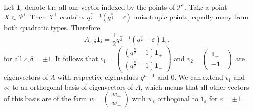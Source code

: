 \documentclass[a4paper]{article}
\theoremstyle{definition}
\newcommand{\eps}{\varepsilon}
\newcommand{\one}{\mathbf 1}
\newcommand{\pp}{\mathcal P}
\begin{document}
Let $\one_\eps$ denote the all-one vector indexed by the points of $\pp^\eps$.
Take a point $X \in \pp^\eps$.
Then $X^\perp$ contains $q^{\frac n2 -1} \left( q^\frac n2 - \eps \right)$ anisotropic points, equally many from both quadratic types.
Therefore,
\[
 A_{\eps,\delta} \one_\delta = \frac 12 q^{\frac n2 - 1} \left( q^\frac n2 - \eps \right) \one_\eps,
\]
for all $\eps, \delta = \pm 1$.
It follows that 
$v_1 = \begin{pmatrix}
 \left( q^\frac n2 - 1 \right) \one_+ \\ \left( q^\frac n2 + 1 \right) \one_-
\end{pmatrix}$
and
$ v_2 = \begin{pmatrix} \one_+ \\ - \one_- \end{pmatrix} $
are eigenvectors of $A$ with respective eigenvalues $q^{n-1}$ and $0$.
We can extend $v_1$ and $v_2$ to an orthogonal basis of eigenvectors of $A$, which means that all other vectors of this basis are of the form $w = \begin{pmatrix} w_+ \\ w_- \end{pmatrix}$ with $w_\eps$ orthogonal to $\one_\eps$ for $\eps = \pm1$.
\end{document}
